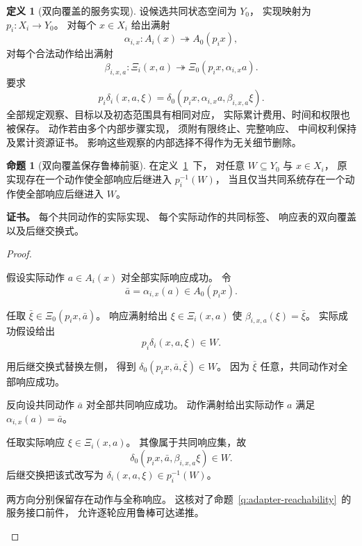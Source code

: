 \documentclass[UTF8,12pt,a4paper,openany,fontset=none,zihao=false]{ctexrep}
\theoremstyle{definition}
\newtheorem{definition}{定义}[chapter]
\newtheorem{proposition}{命题}[chapter]
\newenvironment{certificate}{\par\noindent\textbf{证书。}\ignorespaces}{\par}
\newcommand{\1}{\mathbf 1}
\begin{document}
\begin{definition}[双向覆盖的服务实现]
\label{std:adapters}
设候选共同状态空间为 \(Y_0\)，
实现映射为 \(p_i:X_i\to Y_0\)。
对每个 \(x\in X_i\) 给出满射
\[
\alpha_{i,x}:A_i(x)\twoheadrightarrow A_0(p_ix),
\]
对每个合法动作给出满射
\[
\beta_{i,x,a}:\Xi_i(x,a)
\twoheadrightarrow\Xi_0(p_ix,\alpha_{i,x}a).
\]
要求
\[
p_i\delta_i(x,a,\xi)
=\delta_0(p_ix,\alpha_{i,x}a,\beta_{i,x,a}\xi).
\]
全部规定观察、目标以及初态范围具有相同对应，
实际累计费用、时间和权限也被保存。
动作若由多个内部步骤实现，
须附有限终止、完整响应、
中间权利保持及累计资源证书。
影响这些观察的内部选择不得作为无关细节删除。
\end{definition}

\begin{proposition}[双向覆盖保存鲁棒前驱]
\label{std:robust-predecessor}
在定义~\ref{std:adapters}~下，
对任意 \(W\subseteq Y_0\) 与 \(x\in X_i\)，
原实现存在一个动作使全部响应后继进入 \(p_i^{-1}(W)\)，
当且仅当共同系统存在一个动作使全部响应后继进入 \(W\)。
\end{proposition}
\begin{certificate}
每个共同动作的实际实现、
每个实际动作的共同标签、
响应表的双向覆盖以及后继交换式。
\end{certificate}
\begin{proof}
\begin{semanticsteps}
\item 假设实际动作 \(a\in A_i(x)\) 对全部实际响应成功。
令
\[
\bar a=\alpha_{i,x}(a)\in A_0(p_ix).
\]
\item 任取 \(\bar\xi\in\Xi_0(p_ix,\bar a)\)。
响应满射给出 \(\xi\in\Xi_i(x,a)\)
使 \(\beta_{i,x,a}(\xi)=\bar\xi\)。
实际成功假设给出
\[
p_i\delta_i(x,a,\xi)\in W.
\]
\item 用后继交换式替换左侧，
得到 \(\delta_0(p_ix,\bar a,\bar\xi)\in W\)。
因为 \(\bar\xi\) 任意，共同动作对全部响应成功。
\item 反向设共同动作 \(\bar a\) 对全部共同响应成功。
动作满射给出实际动作 \(a\) 满足
\(\alpha_{i,x}(a)=\bar a\)。
\item 任取实际响应 \(\xi\in\Xi_i(x,a)\)。
其像属于共同响应集，故
\[
\delta_0(p_ix,\bar a,\beta_{i,x,a}\xi)\in W.
\]
后继交换把该式改写为
\(\delta_i(x,a,\xi)\in p_i^{-1}(W)\)。
\item 两方向分别保留存在动作与全称响应。
这核对了命题~\ref{q:adapter-reachability}~的服务接口前件，
允许逐轮应用鲁棒可达递推。
\end{semanticsteps}
\end{proof}
\end{document}
